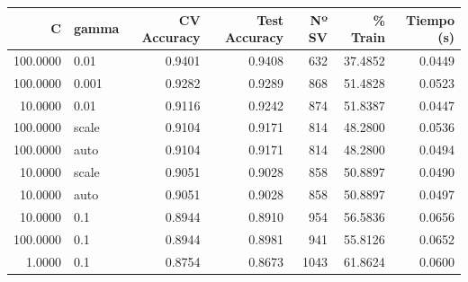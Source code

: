 \begin{tabular}{rlrrrrr}
\toprule
C & gamma & CV Accuracy & Test Accuracy & Nº SV & \% Train & Tiempo (s) \\
\midrule
100.0000 & 0.01 & 0.9401 & 0.9408 & 632 & 37.4852 & 0.0449 \\
100.0000 & 0.001 & 0.9282 & 0.9289 & 868 & 51.4828 & 0.0523 \\
10.0000 & 0.01 & 0.9116 & 0.9242 & 874 & 51.8387 & 0.0447 \\
100.0000 & scale & 0.9104 & 0.9171 & 814 & 48.2800 & 0.0536 \\
100.0000 & auto & 0.9104 & 0.9171 & 814 & 48.2800 & 0.0494 \\
10.0000 & scale & 0.9051 & 0.9028 & 858 & 50.8897 & 0.0490 \\
10.0000 & auto & 0.9051 & 0.9028 & 858 & 50.8897 & 0.0497 \\
10.0000 & 0.1 & 0.8944 & 0.8910 & 954 & 56.5836 & 0.0656 \\
100.0000 & 0.1 & 0.8944 & 0.8981 & 941 & 55.8126 & 0.0652 \\
1.0000 & 0.1 & 0.8754 & 0.8673 & 1043 & 61.8624 & 0.0600 \\
\bottomrule
\end{tabular}
